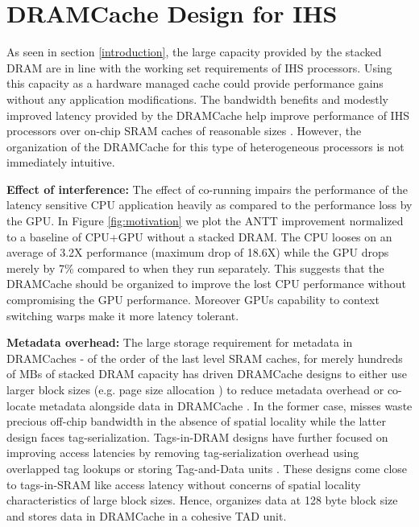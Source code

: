 \section{DRAMCache Design for IHS} \label{motivation}
As seen in section \ref{introduction}, the large capacity provided by the stacked DRAM are in line with the working set requirements of IHS processors. Using this capacity as a hardware managed cache could provide performance gains without any application modifications. The bandwidth benefits and modestly improved latency provided by the DRAMCache help improve performance of IHS processors over on-chip SRAM caches of reasonable sizes \cite{amd-exascale1}. However, the organization of the DRAMCache for this type of heterogeneous processors is not immediately intuitive.
\par \textbf{Effect of interference:} The effect of co-running impairs the performance of the latency sensitive CPU application heavily as compared to the performance loss by the GPU. In Figure \ref{fig:motivation} we plot the ANTT improvement normalized to a baseline of CPU+GPU without a stacked DRAM.  The CPU looses on an average of 3.2X performance (maximum drop of 18.6X) while the GPU drops merely by 7\% compared to when they run separately. This suggests that the DRAMCache should be organized to improve the lost CPU performance without compromising the GPU performance. Moreover GPUs capability to context switching warps make it more latency tolerant.
\par \textbf{Metadata overhead:} The large storage requirement for metadata in DRAMCaches - of the order of the last level SRAM caches, for merely hundreds of MBs of stacked DRAM capacity has driven DRAMCache designs to either use larger block sizes (e.g. page size allocation \cite{footprint}) to reduce metadata overhead or co-locate metadata alongside data in DRAMCache \cite{loh-hill,alloy,atcache}. In the former case, misses waste precious off-chip bandwidth in the absence of spatial locality while the latter design faces tag-serialization. Tags-in-DRAM designs have further focused on improving access latencies by removing tag-serialization overhead using overlapped tag lookups \cite{loh-hill} or storing Tag-and-Data units \cite{alloy}. These designs come close to tags-in-SRAM like access latency without concerns of spatial locality characteristics of large block sizes. Hence, \cachename organizes data at 128 byte block size and stores data in DRAMCache in a cohesive TAD unit.
